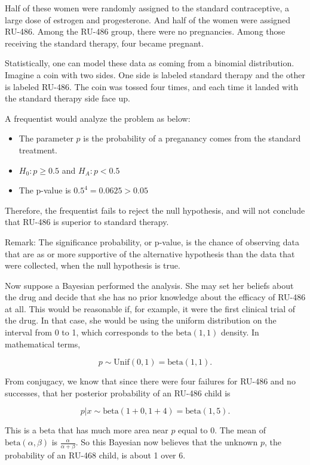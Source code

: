 \documentclass[]{book}
\theoremstyle{definition}
\theoremstyle{definition}
\theoremstyle{remark}
\begin{document}
Half of these women were randomly assigned to the standard
contraceptive, a large dose of estrogen and progesterone. And half of
the women were assigned RU-486. Among the RU-486 group, there were no
pregnancies. Among those receiving the standard therapy, four became
pregnant.

Statistically, one can model these data as coming from a binomial
distribution. Imagine a coin with two sides. One side is labeled
standard therapy and the other is labeled RU-486. The coin was tossed
four times, and each time it landed with the standard therapy side face
up.

A frequentist would analyze the problem as below:

\begin{itemize}
\item
  The parameter \(p\) is the probability of a preganancy comes from the
  standard treatment.
\item
  \(H_0: p \geq 0.5\) and \(H_A: p < 0.5\)
\item
  The p-value is \(0.5^4 = 0.0625 > 0.05\)
\end{itemize}

Therefore, the frequentist fails to reject the null hypothesis, and will
not conclude that RU-486 is superior to standard therapy.

Remark: The significance probability, or p-value, is the chance of
observing data that are as or more supportive of the alternative
hypothesis than the data that were collected, when the null hypothesis
is true.

Now suppose a Bayesian performed the analysis. She may set her beliefs
about the drug and decide that she has no prior knowledge about the
efficacy of RU-486 at all. This would be reasonable if, for example, it
were the first clinical trial of the drug. In that case, she would be
using the uniform distribution on the interval from 0 to 1, which
corresponds to the \(\text{beta}(1,1)\) density. In mathematical terms,

\[p \sim \text{Unif}(0,1) = \text{beta}(1,1).\]

From conjugacy, we know that since there were four failures for RU-486
and no successes, that her posterior probability of an RU-486 child is

\[p|x \sim \text{beta}(1+0,1+4) = \text{beta}(1,5).\]

This is a beta that has much more area near \(p\) equal to 0. The mean
of \(\text{beta}(\alpha,\beta)\) is \(\frac{\alpha}{\alpha+\beta}\). So
this Bayesian now believes that the unknown \(p\), the probability of an
RU-468 child, is about 1 over 6.
\end{document}
